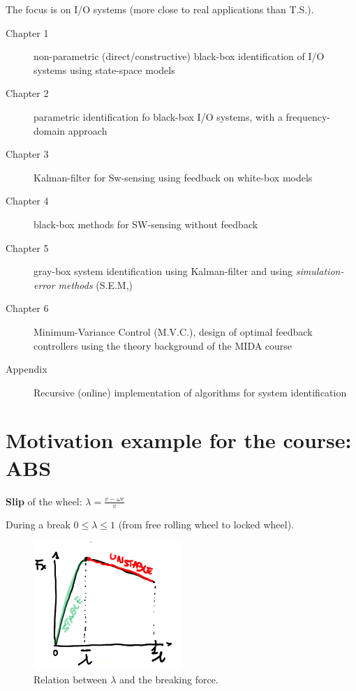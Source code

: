 The focus is on I/O systems (more close to real applications than T.S.).

\begin{description}
    \item[Chapter 1] non-parametric (direct/constructive) black-box identification of I/O systems using state-space models
    \item[Chapter 2] parametric identification fo black-box I/O systems, with a frequency-domain approach
    \item[Chapter 3] Kalman-filter for Sw-sensing using feedback on white-box models
    \item[Chapter 4] black-box methods for SW-sensing without feedback
    \item[Chapter 5] gray-box system identification using Kalman-filter and using \emph{simulation-error methods} (S.E.M,)
    \item[Chapter 6] Minimum-Variance Control (M.V.C.), design of optimal feedback controllers using the theory background of the MIDA course
    \item[Appendix] Recursive (online) implementation of algorithms for system identification
\end{description}

\section{Motivation example for the course: ABS}

\begin{definition}
    \textbf{Slip} of the wheel: $\lambda = \frac{v-\omega r}{v}$
\end{definition}

During a break $0 \le \lambda \le 1$ (from free rolling wheel to locked wheel).
\begin{figure}[H]
    \centering
    \includegraphics[width=0.5\textwidth]{lectures/2020-04-16/lambda-graph.png}
    \caption*{Relation between $\lambda$ and the breaking force.}
\end{figure}

